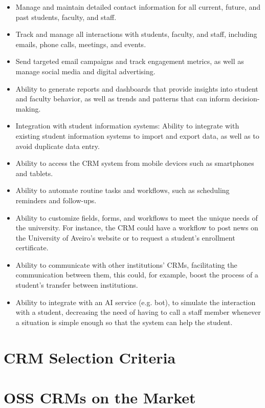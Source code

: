 \documentclass{article}
\begin{document}
\begin{itemize}

    \item Manage and maintain detailed contact information for all current, future, and past students, faculty, and staff.
    \item Track and manage all interactions with students, faculty, and staff, including emails, phone calls, meetings, and events.
    \item Send targeted email campaigns and track engagement metrics, as well as manage social media and digital advertising.
    \item Ability to generate reports and dashboards that provide insights into student and faculty behavior, as well as trends and patterns that can inform decision-making.
    \item Integration with student information systems: Ability to integrate with existing student information systems to import and export data, as well as to avoid duplicate data entry.
    \item Ability to access the CRM system from mobile devices such as smartphones and tablets.
    \item Ability to automate routine tasks and workflows, such as scheduling reminders and follow-ups. 
    \item Ability to customize fields, forms, and workflows to meet the unique needs of the university. For instance, the CRM could have a workflow to post news on the University of Aveiro's website or to request a student's enrollment certificate.
    \item Ability to communicate with other institutions' CRMs, facilitating the communication between them, this could, for example, boost the process of a student's transfer between institutions.
    \item Ability to integrate with an AI service (e.g. bot), to simulate the interaction with a student, decreasing the need of having to call a staff member whenever a situation is simple enough so that the system can help the student.

\end{itemize}


\section{CRM Selection Criteria}




\section{OSS CRMs on the Market}
\end{document}

